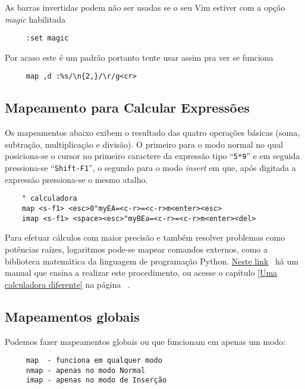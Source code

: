 As barras invertidas podem não ser usadas se o seu Vim estiver com a opção
{\em magic} habilitada

\begin{verbatim}
     :set magic
\end{verbatim}

Por acaso este é um padrão portanto tente usar assim pra ver se funciona

\begin{verbatim}
     map ,d :%s/\n{2,}/\r/g<cr>
\end{verbatim}

\subsection{Mapeamento para Calcular Expressões}
\label{sub:Mapeamento para Calcular Expressões}

Os mapeamentos abaixo exibem o resultado das quatro operações básicas (soma,
subtração, multiplicação e divisão). O primeiro para o modo normal no qual
posiciona-se o cursor no primeiro caractere da expressão tipo ``{\tt 5*9}'' e em
seguida pressiona-se ``{\tt Shift-F1}'', o segundo para o modo {\em insert} em que, após
digitada a expressão pressiona-se o mesmo atalho.

\begin{verbatim}
    " calculadora
    map <s-f1> <esc>0"myEA=<c-r>=<c-r>m<enter><esc>
    imap <s-f1> <space><esc>"myBEa=<c-r>=<c-r>m<enter><del>
\end{verbatim}

Para efetuar cálculos com maior precisão e também resolver problemas como
potências raízes, logaritmos pode-se mapear comandos externos, como a
biblioteca matemática da linguagem de programação Python.
\href{http://vim.wikia.com/wiki/Scientific\_calculator}{Neste link}~\cite{CientificCalculator} há um
manual que ensina a realizar este procedimento, ou acesse o capítulo \ref{Uma
calculadora diferente} na página~ \pageref{Uma calculadora diferente}.


\subsection{Mapeamentos globais}
\label{sub:Mapeamentos globais}


Podemos fazer mapeamentos globais ou que funcionam em apenas um modo:

\begin{verbatim}
     map  - funciona em qualquer modo
     nmap - apenas no modo Normal
     imap - apenas no modo de Inserção
\end{verbatim}

